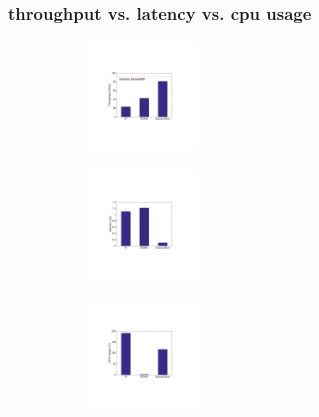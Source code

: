 \subsubsection{throughput vs. latency vs. cpu usage}

\begin{figure}[t]
     \centering 
     \begin{subfigure}[t]
     \centering 
     \includegraphics[width=0.32\textwidth]{figures/motivation/eval_baremetal_thr.pdf}      
     \end{subfigure}      
     \begin{subfigure}[t]
     \centering 
     \includegraphics[width=0.32\textwidth]{figures/motivation/eval_baremetal_latency.pdf}      
     \end{subfigure}      
     \begin{subfigure}[t]
     \centering 
     \includegraphics[width=0.32\textwidth]{figures/motivation/eval_baremetal_cpu.pdf}      
     \end{subfigure}           
     \label{fig:eval_baremetal_thr_latency_cpu}
     \caption{} 
\end{figure} 

